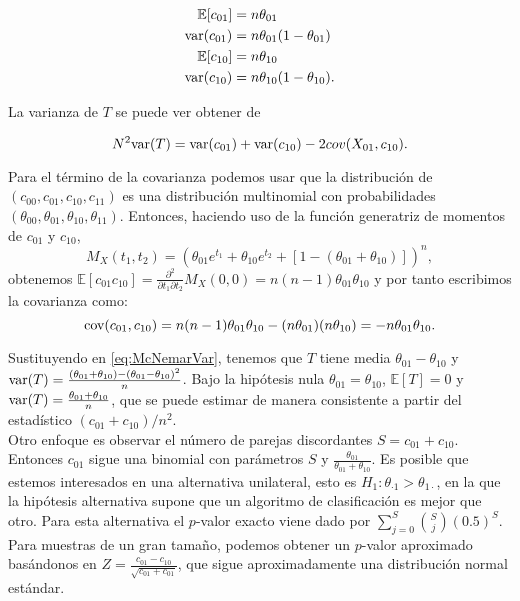 \begin{align*}
	\mathbb{E}[c_{01}] 	&= n \theta_{01} \\
	\text{var}(c_{01}) &= n \theta_{01} (1 - \theta_{01}) \\
	\mathbb{E}[c_{10}] 	&= n \theta_{10} \\
	\text{var}(c_{10}) &= n \theta_{10} (1 - \theta_{10}).
\end{align*}

	La varianza de $T$ se puede ver obtener de 
	
\begin{equation}
	N^2 \text{var}(T) = \text{var}(c_{01}) + \text{var}(c_{10}) - 2 cov(X_{01}, c_{10}).
	\label{eq:McNemarVar}
\end{equation}

	Para el término de la covarianza podemos usar que la 
distribución de $(c_{00}, c_{01}, c_{10}, c_{11})$ es una 
distribución multinomial con probabilidades $(\theta_{00}, 
\theta_{01}, \theta_{10}, \theta_{11})$. Entonces, haciendo 
uso de la función generatriz de momentos de $c_{01}$ y 
$c_{10}$,
	\[ 
		M_X(t_1, t_2) = 
		\left(
			\theta_{01} e^{t_1} + 
			\theta_{10} e^{t_2} + 
			[ 1 - (\theta_{01} + \theta_{10})] \right)^n,
	\]
obtenemos $\mathbb{E}[c_{01}c_{10}] = \frac{\partial^2 }
{\partial t_1 \partial t_2} M_X(0,0) = n(n-1)\theta_{01} 
\theta_{10}$ y por tanto escribimos la covarianza como:
	\[
		\text{cov}( c_{01}, c_{10} ) =
			n (n-1) \theta_{01} \theta_{10} -
			(n \theta_{01}) (n \theta_{10}) = 
			- n \theta_{01} \theta_{10}.
	\]
	
	Sustituyendo en \ref{eq:McNemarVar}, tenemos que $T$ 
tiene media $\theta_{01}-\theta_{10}$ y $\text{var}(T) = 
\frac{(\theta_{01} + \theta_{10}) - (\theta_{01} - 
\theta_{10})^2 }{n}$. Bajo la hipótesis nula $\theta_{01} = 
\theta_{10}$, $\mathbb{E}[T] = 0$ y $\text{var}(T) = \frac{\theta_{01}+
\theta_{10}}{n}$, que se puede estimar de manera consistente 
a partir del estadístico $(c_{01} + c_{10})/n^2$.\\
	Otro enfoque es observar el número de parejas 
discordantes $S = c_{01} + c_{10}$. Entonces $c_{01}$ sigue 
una binomial con parámetros $S$ y $\frac{\theta_{01}}
{\theta_{01}+\theta_{10}}$. Es posible que estemos 
interesados en una alternativa unilateral, esto es $H_1: 
\theta_{\cdot 1} > \theta_{1 \cdot}$, en la que la hipótesis 
alternativa supone que un algoritmo de clasificación es mejor 
que otro. Para esta alternativa el $p$-valor exacto viene 
dado por $\sum\limits_{j=0}^S {S \choose j}(0.5)^S$. Para 
muestras de un gran tamaño, podemos obtener un $p$-valor 
aproximado basándonos en $Z = \frac{c_{01} - c_{10}}
{\sqrt{c_{01} + c_{01}}}$, que sigue aproximadamente una 
distribución normal estándar.
	
